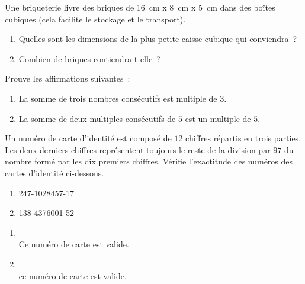 \documentclass[../../syllabus_2.tex]{subfiles}
\begin{document}
\begin{exercise}
    Une briqueterie livre des briques de \SI{16}{cm} x \SI{8}{cm} x \SI{5}{cm} dans des boîtes cubiques (cela facilite le stockage et le transport).
    \begin{enumerate}
        \item Quelles sont les dimensions de la plus petite caisse cubique qui conviendra~?
        \item Combien de briques contiendra-t-elle~?
    \end{enumerate}
\end{exercise}

\begin{exercise}
    Prouve les affirmations suivantes~:
    \begin{enumerate}
        \item La somme de trois nombres consécutifs est multiple de $3$.
        \item La somme de deux multiples consécutifs de $5$ est un multiple de $5$.
    \end{enumerate}
\end{exercise}

\begin{exercise}
    Un numéro de carte d'identité est composé de $12$ chiffres répartis en trois parties. Les deux derniers chiffres représentent toujours le reste de la division par $97$ du nombre formé par les dix premiers chiffres. Vérifie l'exactitude des numéros des cartes d'identité ci-dessous.
    \begin{enumerate}
        \item 247-1028457-17
        \item 138-4376001-52
    \end{enumerate}
\end{exercise}
\begin{solution}
    \begin{enumerate}
        \item {}\\ Ce numéro de carte est valide.
        \item {}\\ ce numéro de carte est valide.
    \end{enumerate}
\end{solution}
\newpage
\end{document}
